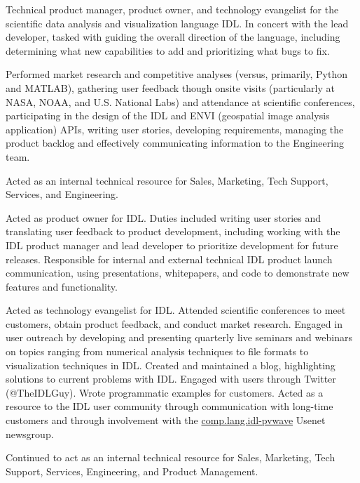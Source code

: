 \begin{compactitem}[\itembullet]
  \item Technical product manager, product owner, and technology
    evangelist for the scientific data analysis and visualization
    language IDL. In concert with the lead developer, tasked with
    guiding the overall direction of the language, including
    determining what new capabilities to add and prioritizing what
    bugs to fix.
  \item Performed market research and competitive analyses (versus,
    primarily, Python and MATLAB), gathering user feedback though
    onsite visits (particularly at NASA, NOAA, and U.S. National Labs)
    and attendance at scientific conferences, participating in the
    design of the IDL and ENVI (geospatial image analysis application)
    APIs, writing user stories, developing requirements, managing the
    product backlog and effectively communicating information to the
    Engineering team.
  \item Acted as an internal technical resource for Sales, Marketing,
    Tech Support, Services, and Engineering.
\end{compactitem}

\begin{compactitem}[\itembullet]
  \item Acted as product owner for IDL. Duties included writing user
    stories and translating user feedback to product development,
    including working with the IDL product manager and lead developer
    to prioritize development for future releases. Responsible for
    internal and external technical IDL product launch communication,
    using presentations, whitepapers, and code to demonstrate new
    features and functionality.
  \item Acted as technology evangelist for IDL. Attended scientific
    conferences to meet customers, obtain product feedback, and
    conduct market research. Engaged in user outreach by developing
    and presenting quarterly live seminars and webinars on topics
    ranging from numerical analysis techniques to file formats to
    visualization techniques in IDL. Created and maintained a blog,
    highlighting solutions to current problems with IDL. Engaged with
    users through Twitter (@TheIDLGuy). Wrote programmatic examples
    for customers. Acted as a resource to the IDL user community
    through communication with long-time customers and through
    involvement with the \url{comp.lang.idl-pvwave} Usenet newsgroup.
  \item Continued to act as an internal technical resource for Sales,
    Marketing, Tech Support, Services, Engineering, and Product
    Management.
\end{compactitem}

